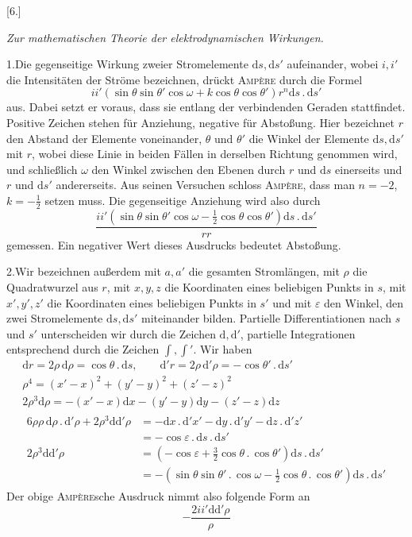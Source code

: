 \begin{center}[6.]\par\medskip\textit{Zur mathematischen Theorie der elektrodynamischen Wirkungen.}\end{center}
1.\quad Die gegenseitige Wirkung zweier Stromelemente $\mathrm ds,\mathrm ds'$ aufeinander, wobei $i,i'$ die Intensitäten der Ströme bezeichnen, drückt \textsc{Ampère} durch die Formel
\[
ii'(\sin\theta\sin\theta'\cos\omega+k\cos\theta\cos\theta')r^n\mathrm ds\,.\,\mathrm ds'
\]
aus. Dabei setzt er voraus, dass sie entlang der verbindenden Geraden stattfindet. Positive Zeichen stehen für Anziehung, negative für Abstoßung. Hier bezeichnet $r$ den Abstand der Elemente voneinander, $\theta$ und $\theta'$ die Winkel der Elemente $\mathrm ds,\mathrm ds'$ mit $r$, wobei diese Linie in beiden Fällen in derselben Richtung genommen wird, und schließlich $\omega$ den Winkel zwischen den Ebenen durch $r$ und $\mathrm ds$ einerseits und $r$ und $\mathrm ds'$ andererseits. Aus seinen Versuchen schloss \textsc{Ampère}, dass man $n=-2$, $k=-\frac{1}{2}$ setzen muss. Die gegenseitige Anziehung wird also durch
\[
\frac{ii'(\sin\theta\sin\theta'\cos\omega-\frac{1}{2}\cos\theta\cos\theta')\mathrm ds\,.\,\mathrm ds'}{rr}
\]
gemessen. Ein negativer Wert dieses Ausdrucks bedeutet Abstoßung.

2.\quad Wir bezeichnen außerdem mit $a,a'$ die gesamten Stromlängen, mit $\rho$ die Quadratwurzel aus $r$, mit $x,y,z$ die Koordinaten eines beliebigen Punkts in $s$, mit $x',y',z'$ die Koordinaten eines beliebigen Punkts in $s'$ und mit $\varepsilon$ den
Winkel, den zwei Stromelemente $\mathrm ds,\mathrm ds'$ miteinander bilden. Partielle Differentiationen nach $s$ und $s'$ unterscheiden wir durch die Zeichen $\mathrm d,\mathrm d'$, partielle Integrationen entsprechend durch die Zeichen $\int,\int'$. Wir haben
\[
\begin{gathered}
\mathrm dr=2\rho\,\mathrm d\rho=\cos\theta\,.\,\mathrm ds,\qquad \mathrm d'r=2\rho\,\mathrm d'\rho=-\cos\theta'\,.\,\mathrm ds'\\
\rho^4=(x'-x)^2+(y'-y)^2+(z'-z)^2\\
2\rho^3\mathrm d\rho=-(x'-x)\mathrm dx-(y'-y)\mathrm dy-(z'-z)\mathrm dz\\
\begin{aligned}
6\rho\rho\,\mathrm d\rho\,.\,\mathrm d'\rho+2\rho^3\mathrm d\mathrm d'\rho
&=-\mathrm dx\,.\,\mathrm d'x'-\mathrm dy\,.\,\mathrm d'y'-\mathrm dz\,.\,\mathrm d'z'\\
&=-\cos\varepsilon\,.\,\mathrm ds\,.\,\mathrm ds'\\
2\rho^3\mathrm d\mathrm d'\rho&=(-\cos\varepsilon+\tfrac{3}{2}\cos\theta\,.\,\cos\theta')\mathrm ds\,.\,\mathrm ds'\\
&=-(\sin\theta\sin\theta'\,.\,\cos\omega-\tfrac{1}{2}\cos\theta\,.\,\cos\theta')\mathrm ds\,.\,\mathrm ds'
\end{aligned}
\end{gathered}
\]
Der obige \textsc{Ampère}sche Ausdruck nimmt also folgende Form an
\[
-\frac{2ii'\mathrm d\mathrm d'\rho}{\rho}
\]

